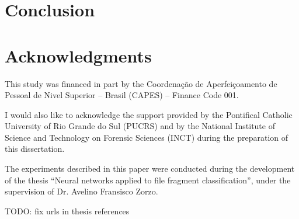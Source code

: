 \documentclass[review]{elsarticle}
\begin{document}
\section{Conclusion}


\section{Acknowledgments}
This study was financed in part by the Coordenação de Aperfeiçoamento de Pessoal de Nivel Superior – Brasil (CAPES) – Finance Code 001.

I would also like to acknowledge the support provided by the Pontifical Catholic University of Rio Grande do Sul (PUCRS) and by the National Institute of Science and Technology on Forensic Sciences (INCT) during the preparation of this dissertation.

The experiments described in this paper were conducted during the development of the thesis ``Neural networks applied to file fragment classification''\cite{romero_atila_leites_neural_2020}, under the supervision of Dr. Avelino Fransisco Zorzo.

TODO: fix urls in thesis references


\end{document}
